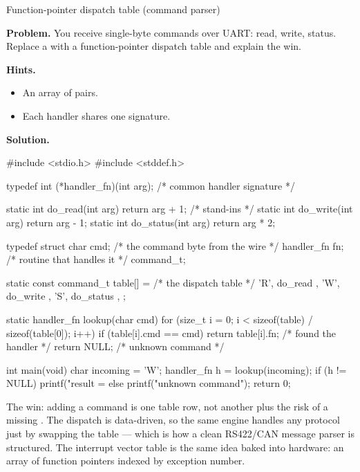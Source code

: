 \begin{gymproblem}{Function-pointer dispatch table (command parser)}

\textbf{Problem.} You receive single-byte commands over UART: 
read,  write,  status. Replace a  with a
function-pointer dispatch table and explain the win.

\textbf{Hints.}
\begin{itemize}
\item An array of  pairs.
\item Each handler shares one signature.
\end{itemize}

\attempt

\textbf{Solution.}
\begin{cgym}
#include <stdio.h>
#include <stddef.h>

typedef int (*handler_fn)(int arg);     /* common handler signature   */

static int do_read(int arg)   { return arg + 1; }  /* stand-ins       */
static int do_write(int arg)  { return arg - 1; }
static int do_status(int arg) { return arg * 2; }

typedef struct {
    char        cmd;          /* the command byte from the wire        */
    handler_fn  fn;           /* routine that handles it               */
} command_t;

static const command_t table[] = {      /* the dispatch table          */
    { 'R', do_read   },
    { 'W', do_write  },
    { 'S', do_status },
};

static handler_fn lookup(char cmd) {
    for (size_t i = 0; i < sizeof(table) / sizeof(table[0]); i++) {
        if (table[i].cmd == cmd) {
            return table[i].fn;          /* found the handler          */
        }
    }
    return NULL;                         /* unknown command            */
}

int main(void) {
    char incoming = 'W';
    handler_fn h = lookup(incoming);
    if (h != NULL) {
        printf("result = %
    } else {
        printf("unknown command\n");
    }
    return 0;
}
\end{cgym}

The win: adding a command is one table row, not another  plus the
risk of a missing . The dispatch is data-driven, so the same
engine handles any protocol just by swapping the table --- which is how a
clean RS422/CAN message parser is structured. The interrupt vector table is
the same idea baked into hardware: an array of function pointers indexed by
exception number.


\end{gymproblem}
